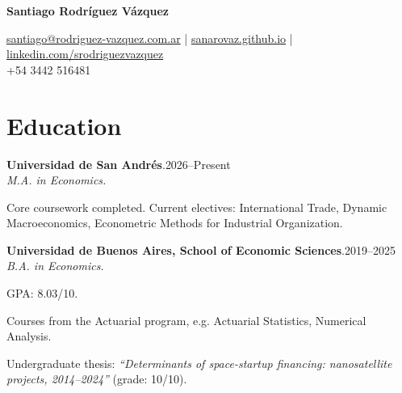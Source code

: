 \documentclass[11pt]{article}
\newcommand{\cvname}{Santiago Rodríguez Vázquez}
\newcommand{\entrydate}[1]{\hfill{\small{#1}}}
\begin{document}
\thispagestyle{firstpage}

{\LARGE\bfseries {\cvname}}

\href{mailto:santiago@rodriguez-vazquez.com.ar}{santiago@rodriguez-vazquez.com.ar} | \href{https://sanarovaz.github.io}{sanarovaz.github.io} | \href{https://linkedin.com/srodriguezvazquez}{linkedin.com/srodriguezvazquez}
\\
+54 3442 516481


\section{Education}
\textbf{Universidad de San Andrés}.\entrydate{2026--Present}\\
\textit{M.A. in Economics.}
\begin{cvitems}
  \item Core coursework completed. Current electives: International Trade, Dynamic
        Macroeconomics, Econometric Methods for Industrial Organization.
\end{cvitems}

\smallskip
\textbf{Universidad de Buenos Aires, School of Economic Sciences}.\entrydate{2019--2025}\\
\textit{B.A. in Economics.}
\begin{cvitems}
  \item GPA: 8.03/10.
  \item Courses from the Actuarial program, e.g. Actuarial Statistics,
        Numerical Analysis.
  \item Undergraduate thesis: \emph{``Determinants of space-startup financing:
        nanosatellite projects, 2014--2024''} (grade: 10/10).
\end{cvitems}

\end{document}
